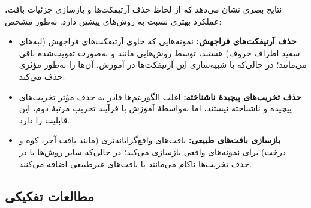 \begin{table}[!ht]
	\centering
	\caption{امتیازات NIQE بر روی مجموعه‌دادهٔ‌های مختلف (مقادیر کمتر بهتر هستند). بهترین نتیجه \textbf{پررنگ} شده است.}
	\label{tbl:niqe_comparison}
	\renewcommand{\arraystretch}{1.3}
\end{table}

نتایج بصری نشان می‌دهد که  از لحاظ حذف آرتیفکت‌ها و بازسازی جزئیات بافت، عملکرد بهتری نسبت به روش‌های پیشین دارد. به‌طور مشخص:
\begin{itemize}
	\item \textbf{حذف آرتیفکت‌های فراجهش:} نمونه‌هایی که حاوی آرتیفکت‌های فراجهش (لبه‌های سفید اطراف حروف) هستند، توسط روش‌هایی مانند  و  به‌صورت تقویت‌شده باقی می‌مانند؛ در حالی‌که  با شبیه‌سازی این آرتیفکت‌ها در آموزش، آن‌ها را به‌طور مؤثری حذف می‌کند.
	\item \textbf{حذف تخریب‌های پیچیدهٔ ناشناخته:} اغلب الگوریتم‌ها قادر به حذف مؤثر تخریب‌های پیچیده و ناشناخته نیستند، اما  به‌واسطهٔ آموزش با فرآیند تخریب مرتبهٔ دوم، این قابلیت را دارد.
	\item \textbf{بازسازی بافت‌های طبیعی:}  بافت‌های واقع‌گرایانه‌تری (مانند بافت آجر، کوه و درخت) برای نمونه‌های واقعی بازسازی می‌کند؛ در حالی‌که سایر روش‌ها یا در حذف تخریب‌ها ناکام می‌مانند یا بافت‌های غیرطبیعی اضافه می‌کنند.
\end{itemize}


\subsection{مطالعات تفکیکی}
\label{subsec:ablation}

